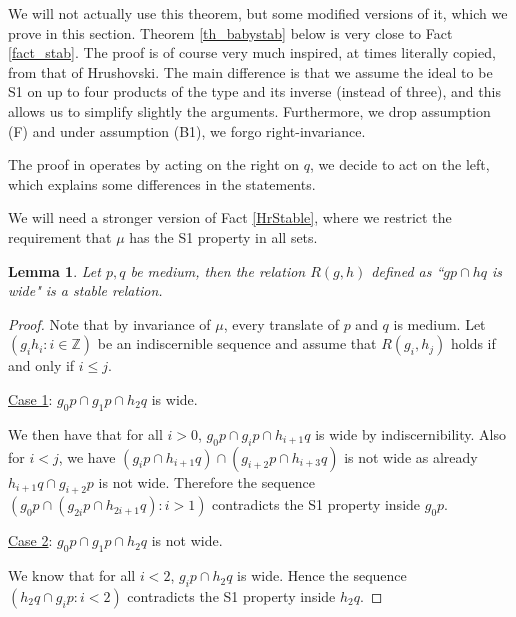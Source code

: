 \documentclass[12pt]{article}
\newtheorem{lemme}[thm]{Lemma}
\theoremstyle{definition}
\theoremstyle{mystyle}
\theoremstyle{remark}
\begin{document}
We will not actually use this theorem, but some modified versions of it, which we prove in this section. Theorem \ref{th_babystab} below is very close to Fact \ref{fact_stab}. The proof is of course very much inspired, at times literally copied, from that of Hrushovski. The main difference is that we assume the ideal to be S1 on up to four products of the type and its inverse (instead of three), and this allows us to simplify slightly the arguments. Furthermore, we drop assumption (F) and under assumption (B1), we forgo right-invariance.

The proof in \cite{Hru12} operates by acting on the right on
$q$, we decide to act on the left, which explains some differences
in the statements.


\medskip

We will need a stronger version of Fact \ref{HrStable}, where we restrict the requirement that $\mu$ has the S1 property in all sets.



\begin{lemme}
Let $p, q$ be medium, then the relation $R(g,h)$ defined as ``$gp\cap hq$ is wide" is a stable relation.
\end{lemme}
\begin{proof}
Note that by invariance of $\mu$, every translate of $p$ and $q$ is medium. Let $(g_i h_i :i \in \mathbb Z)$ be an indiscernible sequence and assume that $R(g_i,h_j)$ holds if and only if $i\leq j$.

\medskip \noindent
\underline{Case 1}: $g_0 p \cap g_1 p \cap h_2 q$ is wide.

\smallskip
We then have that for all $i>0$, $g_0 p \cap g_i p \cap h_{i+1} q$ is wide by indiscernibility. Also for $i<j$, we have $(g_i p \cap h_{i+1}q) \cap( g_{i+2} p \cap h_{i+3}q)$ is not wide as already $h_{i+1}q \cap g_{i+2}p$ is not wide. Therefore the sequence $(g_0 p \cap (g_{2i}p \cap h_{2i+1}q):i>1)$ contradicts the S1 property inside $g_0 p$.

\medskip \noindent
\underline{Case 2}: $g_0 p \cap g_1 p \cap h_2 q$ is not wide.

\smallskip
We know that for all $i<2$, $g_i p \cap h_2 q$ is wide. Hence the sequence $(h_2 q \cap g_i p : i<2)$ contradicts the S1 property inside $h_2 q$.
\end{proof}
\end{document}
